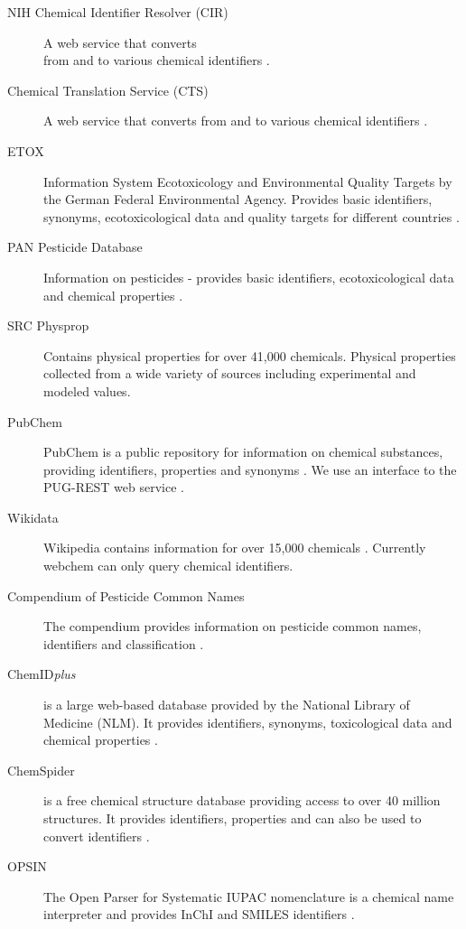 \begin{description}
  \item[NIH Chemical Identifier Resolver (CIR)]{A web service that converts \\from and to various chemical identifiers \citep{cir}.}
  \item[Chemical Translation Service (CTS)]{A web service that converts from and to various chemical identifiers \citep{wohlgemuth_haldiya_willighagen_kind_fiehn_2010}.}
  \item[ETOX]{Information System Ecotoxicology and Environmental Quality Targets by the German Federal Environmental Agency. Provides basic identifiers, synonyms, ecotoxicological data and quality targets for different countries \citep{etox}.}
  \item[PAN Pesticide Database]{Information on pesticides - provides basic identifiers, ecotoxicological data and chemical properties \citep{pan}.}
  \item[SRC Physprop]{Contains physical properties for over 41,000 chemicals.
  Physical properties collected from a wide variety of sources including experimental and modeled values\citep{physprop}.}
  \item[PubChem]{PubChem is a public repository for information on chemical substances, providing identifiers, properties and synonyms \citep{kim2016}.
  We use an interface to the PUG-REST web service \citep{Kim_Thiessen_Bolton_Bryant_2015}.}
  \item[Wikidata]{Wikipedia contains information for over 15,000 chemicals \citep{Ertl_Patiny_Sander_Rufener_Zasso_2015, wiki}. Currently webchem can only query chemical identifiers.}
  \item[Compendium of Pesticide Common Names]{The compendium provides information on pesticide common names, identifiers and classification \citep{wood}.}
  \item[ChemID\emph{plus}] {is a large web-based database provided by the National Library of Medicine (NLM). It provides identifiers, synonyms, toxicological data and chemical properties \citep{tomasulo2002}.}
  \item[ChemSpider]{is a free chemical structure database providing access to over 40 million structures. It provides identifiers, properties and can also be used to convert identifiers \citep{pence_chemspider:_2010}.}
  \item[OPSIN]{The Open Parser for Systematic IUPAC nomenclature is a chemical name interpreter and provides InChI and SMILES identifiers \citep{lowe_corbett_murray-rust_glen_2011}.}
\end{description}

